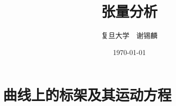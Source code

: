 \documentclass[oneside]{book}
\title{张量分析}
\author{复旦大学　谢锡麟} %
\date{\today}
\theoremstyle{nonumberplain} %
\begin{document}
%	
%	
%		
%	
%		
%	
%		
%	
%		
%	
%		
%	
	\chapter{曲线上的标架及其运动方程}
		
%		
	\printindex
\end{document}
